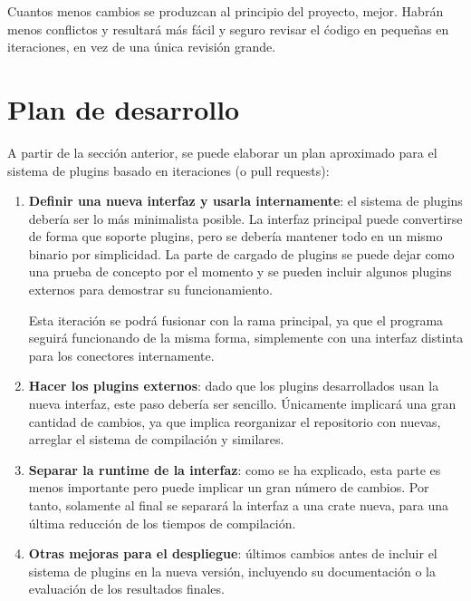 Cuantos menos cambios se produzcan al principio del proyecto, mejor. Habrán
menos conflictos y resultará más fácil y seguro revisar el ćodigo en pequeñas en
iteraciones, en vez de una única revisión grande.

\section{Plan de desarrollo}

A partir de la sección anterior, se puede elaborar un plan aproximado para el
sistema de plugins basado en iteraciones (o pull requests):

\begin{enumerate}
    \item \textbf{Definir una nueva interfaz y usarla internamente}: el sistema
        de plugins debería ser lo más minimalista posible. La interfaz principal
        puede convertirse de forma que soporte plugins, pero se debería mantener
        todo en un mismo binario por simplicidad. La parte de cargado de plugins
        se puede dejar como una prueba de concepto por el momento y se pueden
        incluir algunos plugins externos para demostrar su funcionamiento.

        Esta iteración se podrá fusionar con la rama principal, ya que el
        programa seguirá funcionando de la misma forma, simplemente con una
        interfaz distinta para los conectores internamente.

    \item \textbf{Hacer los plugins externos}: dado que los plugins
        desarrollados usan la nueva interfaz, este paso debería ser sencillo.
        Únicamente implicará una gran cantidad de cambios, ya que implica
        reorganizar el repositorio con \crates nuevas, arreglar el sistema de
        compilación y similares.

    \item \textbf{Separar la runtime de la interfaz}: como se ha explicado, esta
        parte es menos importante pero puede implicar un gran número de cambios.
        Por tanto, solamente al final se separará la interfaz a una crate
         nueva, para una última reducción de los tiempos de
        compilación.

    \item \textbf{Otras mejoras para el despliegue}: últimos cambios antes de
        incluir el sistema de plugins en la nueva versión, incluyendo
        su documentación o la evaluación de los resultados finales.

\end{enumerate}

